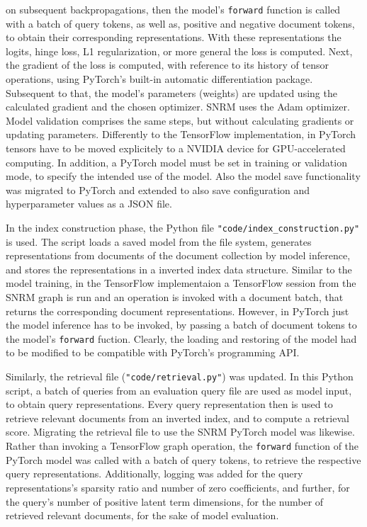     on subsequent backpropagations, 
    then the model's \texttt{forward} function is called with a batch of query tokens, 
    as well as, positive and negative document tokens,
    to obtain their corresponding representations.
With these representations the logits, hinge loss, L1 regularization, or more general the loss is computed.
Next, the gradient of the loss is computed, with reference to its history of tensor operations, using
    PyTorch's built-in automatic differentiation package.
Subsequent to that, the model's parameters (weights) are updated using the calculated gradient and 
    the chosen optimizer.
SNRM uses the Adam optimizer.
Model validation comprises the same steps, but without calculating gradients or updating parameters.
Differently to the TensorFlow implementation, in PyTorch tensors have to be moved explicitely to 
    a NVIDIA device for GPU-accelerated computing.
In addition, a PyTorch model must be set in training or validation mode,
    to specify the intended use of the model.
Also the model save functionality was migrated to PyTorch and extended to also save
    configuration and hyperparameter values as a JSON file.

In the index construction phase, the Python file \texttt{"code/index\_construction.py"} is used.
The script loads a saved model from the file system, generates representations from 
    documents of the document collection by model inference, and stores the representations in
    a inverted index data structure.
Similar to the model training, in the TensorFlow implementaion a TensorFlow session from the SNRM graph is
    run and an operation is invoked with a document batch, that returns the corresponding document 
    representations.
However, in PyTorch just the model inference has to be invoked, by passing a batch of document tokens 
    to the model's \texttt{forward} fuction.
Clearly, the loading and restoring of the model had to be modified to be compatible with PyTorch's 
    programming API.

Similarly, the retrieval file (\texttt{"code/retrieval.py"}) was updated.
In this Python script, a batch of queries from an evaluation query file are used as model input,
    to obtain query representations.
Every query representation then is used to retrieve relevant documents from an inverted index,
    and to compute a retrieval score.
Migrating the retrieval file to use the SNRM PyTorch model was likewise.
Rather than invoking a TensorFlow graph operation, the \texttt{forward} function 
    of the PyTorch model was called with a batch of query tokens,
    to retrieve the respective query representations.
Additionally, logging was added for the query representations's sparsity ratio and number of zero coefficients,
    and further, for the query's number of positive latent term dimensions, 
    for the number of retrieved relevant documents, for the sake of model evaluation.




